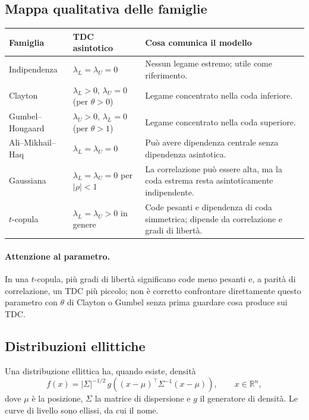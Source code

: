 \documentclass[11pt,a4paper]{article}
\newcommand{\R}{\mathbb{R}}
\begin{document}
\subsection{Mappa qualitativa delle famiglie}
\begin{center}
\small
\begin{tabular}{p{2.7cm}p{3.3cm}p{4.4cm}}
\toprule
Famiglia & TDC asintotico & Cosa comunica il modello\\
\midrule
Indipendenza & $\lambda_L=\lambda_U=0$ & Nessun legame estremo; utile come riferimento.\\
Clayton & $\lambda_L>0$, $\lambda_U=0$ (per $\theta>0$) & Legame concentrato nella coda inferiore.\\
Gumbel--Hougaard & $\lambda_U>0$, $\lambda_L=0$ (per $\theta>1$) & Legame concentrato nella coda superiore.\\
Ali--Mikhail--Haq & $\lambda_L=\lambda_U=0$ & Può avere dipendenza centrale senza dipendenza asintotica.\\
Gaussiana & $\lambda_L=\lambda_U=0$ per $|\rho|<1$ & La correlazione può essere alta, ma la coda estrema resta asintoticamente indipendente.\\
$t$-copula & $\lambda_L=\lambda_U>0$ in genere & Code pesanti e dipendenza di coda simmetrica; dipende da correlazione e gradi di libertà.\\
\bottomrule
\end{tabular}
\end{center}

\paragraph{Attenzione al parametro.}
In una $t$-copula, più gradi di libertà significano code meno pesanti e, a
parità di correlazione, un TDC più piccolo; non è corretto confrontare
direttamente questo parametro con $\theta$ di Clayton o Gumbel senza prima
guardare cosa produce sui TDC.

\subsection{Distribuzioni ellittiche}
Una distribuzione ellittica ha, quando esiste, densità
\begin{equation}
 f(x)=|\Sigma|^{-1/2}\,g\!\left((x-\mu)^\top\Sigma^{-1}(x-\mu)\right),
 \qquad x\in\R^n,
 \label{eq:elliptical}
\end{equation}
dove $\mu$ è la posizione, $\Sigma$ la matrice di dispersione e $g$ il
generatore di densità. Le curve di livello sono ellissi, da cui il nome.
\end{document}
